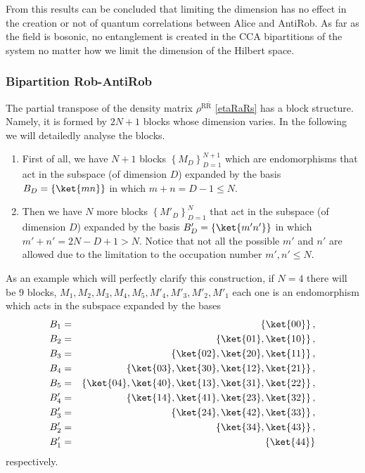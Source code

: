 From this results can be concluded that limiting the dimension has no effect in the creation or not of quantum correlations between Alice and AntiRob. As far as the field is bosonic, no entanglement is created in the CCA bipartitions of the system no matter how we limit the dimension of the Hilbert space.


\subsubsection{Bipartition Rob-AntiRob}

The partial transpose of the density matrix $\rho^{\text{R}{\bar{\text{R}}}}$  \eqref{etaRaRs} has a block structure. Namely, it is formed by $2N+1$ blocks whose dimension varies. In the following we will detailedly analyse the blocks.

\begin{enumerate}
\item First of all, we have $N+1$ blocks $\left\{M_D\right\}_{D=1}^{N+1}$  which are  endomorphisms that act in the subspace (of dimension $D$) expanded by the basis $B_{D}=\{\ket{mn}\}$ in which $m+n=D-1\le N$. 
\item Then we have $N$ more blocks $\left\{M'_D\right\}_{D=1}^N$ that  act in the subspace (of dimension $D$) expanded by the basis $B'_{D}=\{\ket{m'n'}\}$ in which $m'+n'=2N-D+1>N$. Notice that not all the possible $m'$ and $n'$ are allowed due to the limitation to the occupation number $m',n'\le N$.
\end{enumerate}

As an example which will perfectly clarify this construction, if $N=4$ there will be 9 blocks, $M_1,M_2,M_3,M_4,M_5, M'_4,M'_3,M'_2,M'_1$ each one is an endomorphism which acts in the subspace expanded by the bases
\begin{eqnarray}
\nonumber B_1&=&\left\{\ket{00}\right\},\\*
\nonumber B_2&=&\left\{\ket{01},\ket{10}\right\},\\*
\nonumber B_3&=&\left\{\ket{02},\ket{20},\ket{11}\right\},\\*
\nonumber B_4&=&\left\{\ket{03},\ket{30},\ket{12},\ket{21}\right\},\\*
\nonumber B_5&=&\left\{\ket{04},\ket{40},\ket{13},\ket{31},\ket{22}\right\},\\*
\nonumber B'_4&=&\left\{\ket{14},\ket{41},\ket{23},\ket{32}\right\},\\*
\nonumber B'_3&=&\left\{\ket{24},\ket{42},\ket{33}\right\},\\*
\nonumber B'_2&=&\left\{\ket{34},\ket{43}\right\},\\*
\nonumber B'_1&=&\left\{\ket{44}\right\}\\*
\end{eqnarray}
respectively.


